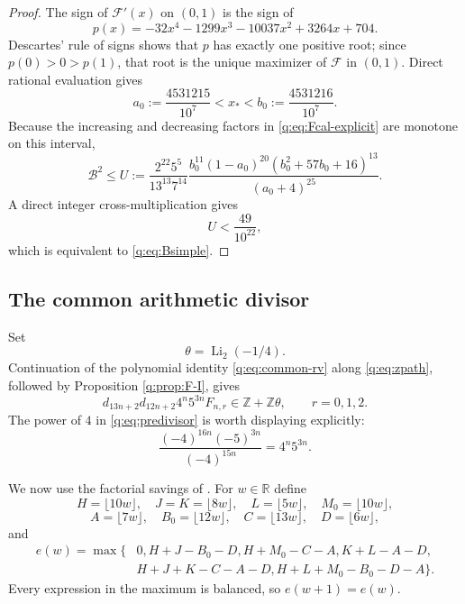 \documentclass[11pt]{amsart}
\newcommand{\Li}{\operatorname{Li}}
\newcommand{\Z}{\mathbb Z}
\theoremstyle{plain}
\theoremstyle{remark}\newtheorem{remark}[theorem]{Remark}
\numberwithin{equation}{section}
\begin{document}
\begin{proof}
The sign of $\mathcal F'(x)$ on $(0,1)$ is the sign of
\begin{equation}\label{q:eq:quartic}
 p(x)=-32x^4-1299x^3-10037x^2+3264x+704.
\end{equation}
Descartes' rule of signs shows that $p$ has exactly one positive root; since
$p(0)>0>p(1)$, that root is the unique maximizer of $\mathcal F$ in $(0,1)$.
Direct rational evaluation gives
\begin{equation}\label{q:eq:xbracket}
 a_0:=\frac{4531215}{10^7}<x_*<
 b_0:=\frac{4531216}{10^7}.
\end{equation}
Because the increasing and decreasing factors in \eqref{q:eq:Fcal-explicit}
are monotone on this interval,
\begin{equation}\label{q:eq:Ubound}
 \mathcal B^2\le U:=
 \frac{2^{22}5^5}{13^{13}7^{14}}
 \frac{b_0^{11}(1-a_0)^{20}(b_0^2+57b_0+16)^{13}}
      {(a_0+4)^{25}}.
\end{equation}
A direct integer cross-multiplication gives
\[
 U<\frac{49}{10^{22}},
\]
which is equivalent to \eqref{q:eq:Bsimple}.
\end{proof}

\subsection{The common arithmetic divisor}\label{q:sec:arithmetic}

Set
\begin{equation}\label{q:eq:theta}
  \theta=\Li_2(-1/4).
\end{equation}
Continuation of the polynomial identity \eqref{q:eq:common-rv} along
\eqref{q:eq:zpath}, followed by Proposition \ref{q:prop:F-I}, gives
\begin{equation}\label{q:eq:predivisor}
 d_{13n+2}d_{12n+2}4^n5^{3n}F_{n,r}
 \in\Z+\Z\theta,
 \qquad r=0,1,2.
\end{equation}
The power of $4$ in \eqref{q:eq:predivisor} is worth displaying explicitly:
\begin{equation}\label{q:eq:scaling-one-line}
 \frac{(-4)^{16n}(-5)^{3n}}{(-4)^{15n}}
 =4^n5^{3n}.
\end{equation}

We now use the factorial savings of \cite[\S\S3--4]{RV05}.  For
$w\in\mathbb R$ define
\[
 H=\lfloor10w\rfloor,\quad J=K=\lfloor8w\rfloor,
 \quad L=\lfloor5w\rfloor,\quad M_0=\lfloor10w\rfloor,
\]
\[
 A=\lfloor7w\rfloor,\quad B_0=\lfloor12w\rfloor,
 \quad C=\lfloor13w\rfloor,\quad D=\lfloor6w\rfloor,
\]
and
\begin{equation}\label{q:eq:e-def}
\begin{split}
 e(w)=\max\{&0,
 H+J-B_0-D,
 H+M_0-C-A,
 K+L-A-D,\\
 &H+J+K-C-A-D,
 H+L+M_0-B_0-D-A\}.
\end{split}
\end{equation}
Every expression in the maximum is balanced, so $e(w+1)=e(w)$.
\end{document}
